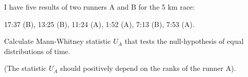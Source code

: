 
\begin{question}
I have five results of two runners A and B for the 5 km race:

17:37 (B), 13:25 (B), 11:24 (A), 1:52 (A), 7:13 (B), 7:53 (A).

Calculate Mann-Whitney statistic \(U_A\) that tests the null-hypothesis of equal distributions of time.

(The statistic \(U_A\) should positively depend on the ranks of the runner A).
\end{question}


